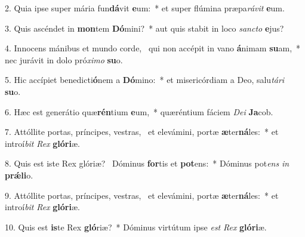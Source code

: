 2. Quia ipse super mária fun\textbf{dá}vit \textbf{e}um:~*  et super flúmina præpa\textit{rá}\textit{vit} \textbf{e}um.\

3. Quis ascéndet in \textbf{mon}tem \textbf{Dó}mini?~*  aut quis stabit in loco \textit{sanc}\textit{to} \textbf{e}jus?\

4. Innocens mánibus et mundo corde, \dag\  qui non accépit in vano \textbf{á}nimam \textbf{su}am,~*  nec jurávit in dolo pró\textit{xi}\textit{mo} \textbf{su}o.\

5. Hic accípiet benedicti\textbf{ó}nem a \textbf{Dó}mino:~*  et misericórdiam a Deo, salu\textit{tá}\textit{ri} \textbf{su}o.\

6. Hæc est generátio quæ\textbf{rén}tium \textbf{e}um,~*  quæréntium fáciem \textit{De}\textit{i} \textbf{Ja}cob.\

7. Attóllite portas, príncipes, vestras, \dag\  et elevámini, portæ \textbf{æ}ter\textbf{ná}les:~*  et introí\textit{bit} \textit{Rex} \textbf{gló}\textbf{ri}æ.\

8. Quis est iste Rex glóriæ? \dag\  Dóminus \textbf{for}tis et \textbf{pot}ens:~*  Dóminus pot\textit{ens} \textit{in} \textbf{prǽ}\textbf{li}o.\

9. Attóllite portas, príncipes, vestras, \dag\  et elevámini, portæ \textbf{æ}ter\textbf{ná}les:~*  et introí\textit{bit} \textit{Rex} \textbf{gló}\textbf{ri}æ.\

10. Quis est \textbf{is}te Rex \textbf{gló}riæ?~*  Dóminus virtútum ipse \textit{est} \textit{Rex} \textbf{gló}\textbf{ri}æ.\

